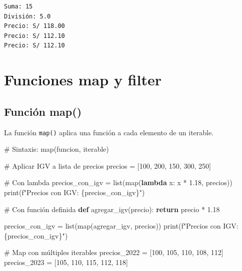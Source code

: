 \documentclass[
  doc,
  floatsintext,
  longtable,
  a4paper,
  nolmodern,
  notxfonts,
  notimes,
  12pt,
  colorlinks=true,linkcolor=blue,citecolor=blue,urlcolor=blue]{apa7}
\newenvironment{Shaded}{\begin{snugshade}}{\end{snugshade}}
\newcommand{\BuiltInTok}[1]{\textcolor[rgb]{0.00,0.23,0.31}{#1}}
\newcommand{\CommentTok}[1]{\textcolor[rgb]{0.37,0.37,0.37}{#1}}
\newcommand{\ControlFlowTok}[1]{\textcolor[rgb]{0.00,0.23,0.31}{\textbf{#1}}}
\newcommand{\DecValTok}[1]{\textcolor[rgb]{0.68,0.00,0.00}{#1}}
\newcommand{\FloatTok}[1]{\textcolor[rgb]{0.68,0.00,0.00}{#1}}
\newcommand{\KeywordTok}[1]{\textcolor[rgb]{0.00,0.23,0.31}{\textbf{#1}}}
\newcommand{\NormalTok}[1]{\textcolor[rgb]{0.00,0.23,0.31}{#1}}
\newcommand{\OperatorTok}[1]{\textcolor[rgb]{0.37,0.37,0.37}{#1}}
\newcommand{\SpecialCharTok}[1]{\textcolor[rgb]{0.37,0.37,0.37}{#1}}
\newcommand{\SpecialStringTok}[1]{\textcolor[rgb]{0.13,0.47,0.30}{#1}}
\begin{document}
\begin{verbatim}
Suma: 15
División: 5.0
Precio: S/ 118.00
Precio: S/ 112.10
Precio: S/ 112.10
\end{verbatim}

\section{Funciones map y filter}\label{funciones-map-y-filter}

\subsection{Función map()}\label{funciuxf3n-map}

La función \texttt{map()} aplica una función a cada elemento de un
iterable.

\begin{Shaded}
\begin{Highlighting}[]
\CommentTok{\# Sintaxis: map(funcion, iterable)}

\CommentTok{\# Aplicar IGV a lista de precios}
\NormalTok{precios }\OperatorTok{=}\NormalTok{ [}\DecValTok{100}\NormalTok{, }\DecValTok{200}\NormalTok{, }\DecValTok{150}\NormalTok{, }\DecValTok{300}\NormalTok{, }\DecValTok{250}\NormalTok{]}

\CommentTok{\# Con lambda}
\NormalTok{precios\_con\_igv }\OperatorTok{=} \BuiltInTok{list}\NormalTok{(}\BuiltInTok{map}\NormalTok{(}\KeywordTok{lambda}\NormalTok{ x: x }\OperatorTok{*} \FloatTok{1.18}\NormalTok{, precios))}
\BuiltInTok{print}\NormalTok{(}\SpecialStringTok{f"Precios con IGV: }\SpecialCharTok{\{}\NormalTok{precios\_con\_igv}\SpecialCharTok{\}}\SpecialStringTok{"}\NormalTok{)}

\CommentTok{\# Con función definida}
\KeywordTok{def}\NormalTok{ agregar\_igv(precio):}
    \ControlFlowTok{return}\NormalTok{ precio }\OperatorTok{*} \FloatTok{1.18}

\NormalTok{precios\_con\_igv }\OperatorTok{=} \BuiltInTok{list}\NormalTok{(}\BuiltInTok{map}\NormalTok{(agregar\_igv, precios))}
\BuiltInTok{print}\NormalTok{(}\SpecialStringTok{f"Precios con IGV: }\SpecialCharTok{\{}\NormalTok{precios\_con\_igv}\SpecialCharTok{\}}\SpecialStringTok{"}\NormalTok{)}

\CommentTok{\# Map con múltiples iterables}
\NormalTok{precios\_2022 }\OperatorTok{=}\NormalTok{ [}\DecValTok{100}\NormalTok{, }\DecValTok{105}\NormalTok{, }\DecValTok{110}\NormalTok{, }\DecValTok{108}\NormalTok{, }\DecValTok{112}\NormalTok{]}
\NormalTok{precios\_2023 }\OperatorTok{=}\NormalTok{ [}\DecValTok{105}\NormalTok{, }\DecValTok{110}\NormalTok{, }\DecValTok{115}\NormalTok{, }\DecValTok{112}\NormalTok{, }\DecValTok{118}\NormalTok{]}


\end{Highlighting}
\end{Shaded}
\end{document}
